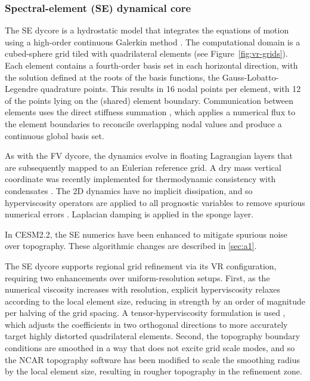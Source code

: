 \documentclass[draft]{agujournal2019}
\begin{document}
\subsubsection{Spectral-element (SE) dynamical core}

The SE dycore is a hydrostatic model that integrates the equations of motion using a high-order continuous Galerkin method \cite{TTI1997JCP,TF2010JCP}. The computational domain is a cubed-sphere grid tiled with quadrilateral elements (see Figure~\ref{fig:vr-grids}). Each element contains a fourth-order basis set in each horizontal direction, with the solution defined at the roots of the basis functions, the Gauss-Lobatto-Legendre quadrature points. This results in 16 nodal points per element, with 12 of the points lying on the (shared) element boundary. Communication between elements uses the direct stiffness summation \cite{canuto2007}, which applies a numerical flux to the element boundaries to reconcile overlapping nodal values and produce a continuous global basis set. 

As with the FV dycore, the dynamics evolve in floating Lagrangian layers that are subsequently mapped to an Eulerian reference grid. A dry mass vertical coordinate was recently implemented for thermodynamic consistency with condensates \cite{LetAl2018JAMES}. The 2D dynamics have no implicit dissipation, and so hyperviscosity operators are applied to all prognostic variables to remove spurious numerical errors \cite{DetAl2012IJHPCA}. Laplacian damping is applied in the sponge layer.

In CESM2.2, the SE numerics have been enhanced to mitigate spurious noise over topography. These algorithmic changes are described in \ref{sec:a1}.

The SE dycore supports regional grid refinement via its VR configuration, requiring two enhancements over uniform-resolution setups. First, as the numerical viscosity increases with resolution, explicit hyperviscosity relaxes according to the local element size, reducing in strength  by an order of magnitude per halving of the grid spacing. A tensor-hyperviscosity formulation is used \cite{GetAl2014GMD}, which adjusts the coefficients in two orthogonal directions to more accurately target highly distorted quadrilateral elements. Second, the topography boundary conditions are smoothed in a way that does not excite grid scale modes, and so the NCAR topography software \cite{gmdd-8-4623-2015} has been modified to scale the smoothing radius by the local element size, resulting in rougher topography in the refinement zone. 
\end{document}
